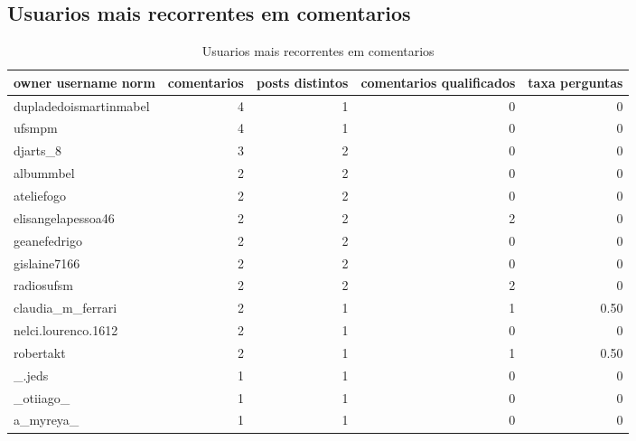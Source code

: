 \documentclass[12pt,a4paper]{article}
\begin{document}
\subsection{Usuarios mais recorrentes em comentarios}
\begin{table}[H]
\centering
\scriptsize
\begin{adjustbox}{max width=\textwidth}
\begin{tabular}{l r r r r}
\toprule
owner username norm & comentarios & posts distintos & comentarios qualificados & taxa perguntas \\
\midrule
dupladedoismartinmabel & 4 & 1 & 0 & 0 \\
ufsmpm & 4 & 1 & 0 & 0 \\
djarts\_8 & 3 & 2 & 0 & 0 \\
albummbel & 2 & 2 & 0 & 0 \\
ateliefogo & 2 & 2 & 0 & 0 \\
elisangelapessoa46 & 2 & 2 & 2 & 0 \\
geanefedrigo & 2 & 2 & 0 & 0 \\
gislaine7166 & 2 & 2 & 0 & 0 \\
radiosufsm & 2 & 2 & 2 & 0 \\
claudia\_m\_ferrari & 2 & 1 & 1 & 0.50 \\
nelci.lourenco.1612 & 2 & 1 & 0 & 0 \\
robertakt & 2 & 1 & 1 & 0.50 \\
\_.jeds & 1 & 1 & 0 & 0 \\
\_otiiago\_ & 1 & 1 & 0 & 0 \\
a\_myreya\_ & 1 & 1 & 0 & 0 \\
\bottomrule
\end{tabular}
\end{adjustbox}
\caption{Usuarios mais recorrentes em comentarios}
\label{tab:commenters}
\end{table}
\end{document}
